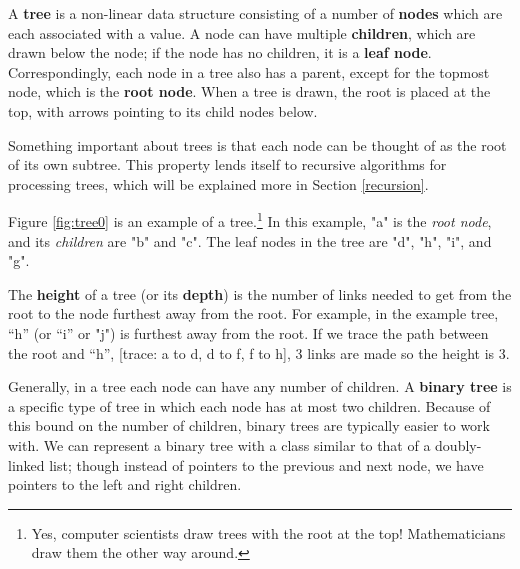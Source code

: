 A \textbf{tree} is a non-linear data structure consisting of a number of \textbf{nodes} which are each associated with a value. A node can have multiple \textbf{children}, which are drawn below the node; if the node has no children, it is a \textbf{leaf node}. Correspondingly, each node in a tree also has a parent, except for the topmost node, which is the \textbf{root node}. When a tree is drawn, the root is placed at the top, with arrows pointing to its child nodes below.

Something important about trees is that each node can be thought of as the root of its own subtree. This property lends itself to recursive algorithms for processing trees, which will be explained more in Section \ref{recursion}.

Figure \ref{fig:tree0} is an example of a tree.\footnote{Yes, computer scientists draw trees with the root at the top! Mathematicians draw them the other way around.} In this example, "a" is the \textit{root node}, and its \textit{children} are "b" and "c". The leaf nodes in the tree are "d", "h", "i", and "g".


The \textbf{height} of a tree (or its \textbf{depth}) is the number of links needed to get from the root to the node furthest away from the root. For example, in the example tree, “h” (or “i” or "j") is furthest away from the root. If we trace the path between the root and “h”, [trace: a to d, d to f, f to h], 3 links are made so the height is 3.


Generally, in a tree each node can have any number of children. A \textbf{binary tree} is a specific type of tree in which each node has at most two children. Because of this bound on the number of children, binary trees are typically easier to work with. We can represent a binary tree with a class similar to that of a doubly-linked list; though instead of pointers to the previous and next node, we have pointers to the left and right children.


\begin{comment}
A \textbf{complete binary tree} is a binary tree in which every node has two children (except the leaves of course) and all leaves are found at the same depth. You can think of complete binary trees as being "filled up" because there's no more space to add nodes without increasing the height.
\end{comment}


